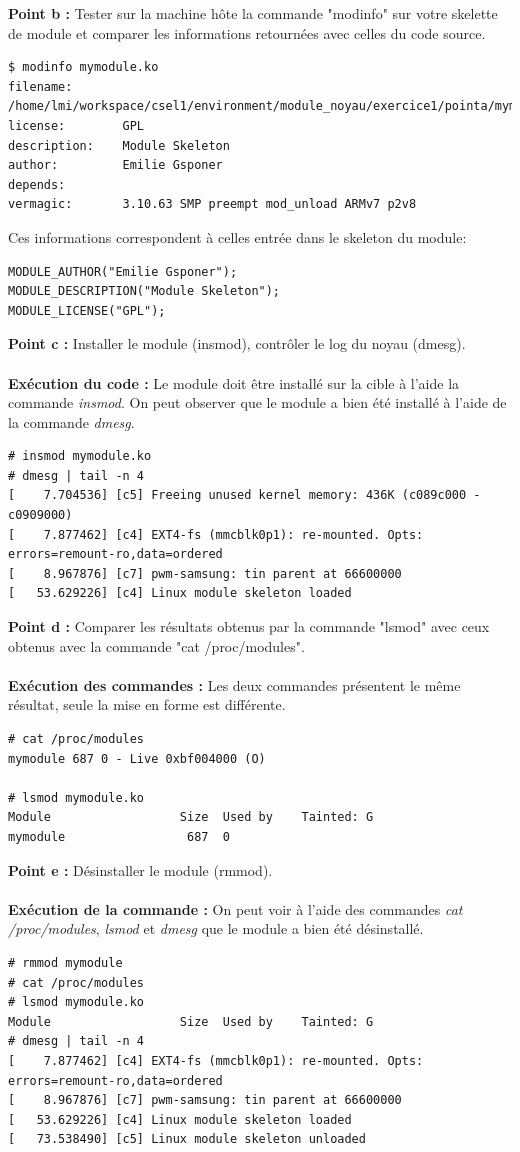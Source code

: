 \textbf{Point b :} Tester sur la machine hôte la commande "modinfo" sur	votre	skelette de	module et comparer les	informations retournées	avec celles	du	code source.
\begin{lstlisting}
$ modinfo mymodule.ko
filename:       /home/lmi/workspace/csel1/environment/module_noyau/exercice1/pointa/mymodule.ko
license:        GPL
description:    Module Skeleton
author:         Emilie Gsponer
depends:        
vermagic:       3.10.63 SMP preempt mod_unload ARMv7 p2v8 
\end{lstlisting}
Ces informations correspondent à celles entrée dans le skeleton du module:
\begin{lstlisting}
MODULE_AUTHOR("Emilie Gsponer");
MODULE_DESCRIPTION("Module Skeleton");
MODULE_LICENSE("GPL");
\end{lstlisting}
\textbf{Point c :} Installer	le	module (insmod),	contrôler	le	log	du	noyau	(dmesg).\\\\
\textbf{Exécution du code : }Le module doit être installé sur la cible à l'aide la commande \textit{insmod}. On peut observer que le module a bien été installé à l'aide de la commande \textit{dmesg}.
\begin{lstlisting}
# insmod mymodule.ko
# dmesg | tail -n 4
[    7.704536] [c5] Freeing unused kernel memory: 436K (c089c000 - c0909000)
[    7.877462] [c4] EXT4-fs (mmcblk0p1): re-mounted. Opts: errors=remount-ro,data=ordered
[    8.967876] [c7] pwm-samsung: tin parent at 66600000
[   53.629226] [c4] Linux module skeleton loaded

\end{lstlisting}
\textbf{Point d :} Comparer	les	résultats	obtenus	par	la	commande	"lsmod"	avec	ceux	obtenus	avec	la	commande	"cat /proc/modules".\\\\
\textbf{Exécution des commandes : } Les deux commandes présentent le même résultat, seule la mise en forme est différente.
\begin{lstlisting}
# cat /proc/modules
mymodule 687 0 - Live 0xbf004000 (O)

# lsmod mymodule.ko
Module                  Size  Used by    Tainted: G  
mymodule                 687  0 
\end{lstlisting}
\textbf{Point e :} Désinstaller	le	module	(rmmod).\\\\
\textbf{Exécution de la commande : } On peut voir à l'aide des commandes \textit{cat /proc/modules}, \textit{lsmod} et \textit{dmesg} que le module a bien été désinstallé.
\begin{lstlisting}
# rmmod mymodule
# cat /proc/modules
# lsmod mymodule.ko
Module                  Size  Used by    Tainted: G  
# dmesg | tail -n 4
[    7.877462] [c4] EXT4-fs (mmcblk0p1): re-mounted. Opts: errors=remount-ro,data=ordered
[    8.967876] [c7] pwm-samsung: tin parent at 66600000
[   53.629226] [c4] Linux module skeleton loaded
[   73.538490] [c5] Linux module skeleton unloaded
\end{lstlisting}

